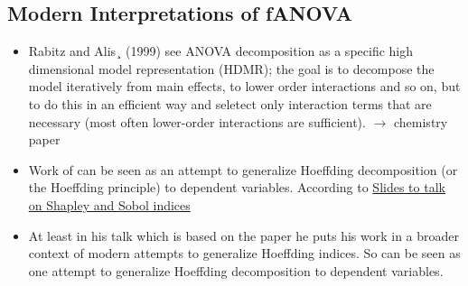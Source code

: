 \subsection*{Modern Interpretations of fANOVA}
\begin{itemize}
    \item Rabitz and Alis¸ (1999) see ANOVA decomposition as a specific high dimensional model representation (HDMR); the goal is to decompose the model iteratively from main effects, to lower order interactions and so on, but to do this in an efficient way and seletect only interaction terms that are necessary (most often lower-order interactions are sufficient). $\rightarrow$ chemistry paper
    \item Work of \cite{hooker_generalized_2007} can be seen as an attempt to generalize Hoeffding decomposition (or the Hoeffding principle) to dependent variables. According to \href{https://static1.squarespace.com/static/5f704d21e5464d602d153738/t/66ec27cadf4e8d42ed9018d0/1726752718798/20240918_SADiscord_MIL.pdf}{Slides to talk on Shapley and Sobol indices}
    \item At least in his talk which is based on the paper \cite{il_idrissi_hoeffding_2025} he puts his work in a broader context of modern attempts to generalize Hoeffding indices. So \cite{il_idrissi_hoeffding_2025} can be seen as one attempt to generalize Hoeffding decomposition to dependent variables.
\end{itemize}


